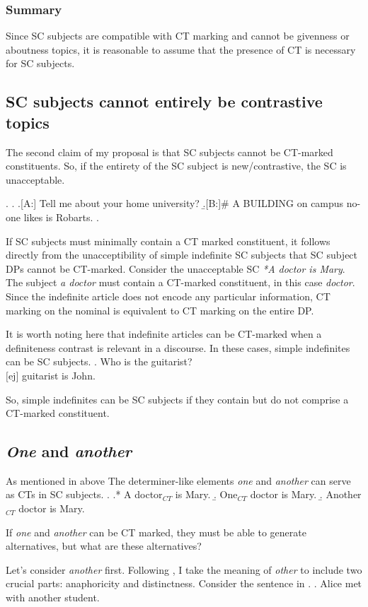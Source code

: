 \documentclass[GPFinal]{subfiles}
\begin{document}
\subsubsection{Summary}
Since SC subjects are compatible with CT marking and cannot be givenness or aboutness topics, it is reasonable to assume that the presence of CT is necessary for SC subjects.
\subsection{SC subjects cannot entirely be contrastive topics}
The second claim of my proposal is that SC subjects cannot be CT-marked constituents.
So, if the entirety of the SC subject is new/contrastive, the SC is unacceptable.

\ex.
\a.
\a.[A:] Tell me about your home university?
\b.[B:]\# A BUILDING on campus no-one likes is Robarts.
\z.

If SC subjects must minimally contain a CT marked constituent, it follows directly from the unacceptibility of simple indefinite SC subjects that SC subject DPs cannot be CT-marked.
Consider the unacceptable SC \textit{*A doctor is Mary}.
The subject \textit{a doctor} must contain a CT-marked constituent, in this case \textit{doctor}.
Since the indefinite article does not encode any particular information, CT marking on the nominal is equivalent to CT marking on the entire DP.

It is worth noting here that indefinite articles can be CT-marked when a definiteness contrast is relevant in a discourse.
In these cases, simple indefinites can be SC subjects.
\ex. Who is the guitarist?\\
$[$ej$]$ guitarist is John.

So, simple indefinites can be SC subjects if they contain but do not comprise a CT-marked constituent.
\subsection{\textit{One} and \textit{another}}
As mentioned in above The determiner-like elements \textit{one} and \textit{another} can serve as CTs in SC subjects.
\ex.\label{ex:AONeAnother}
\a.* A doctor$_{CT}$ is Mary.
\b.\label{ex:OneCT} One$_{CT}$ doctor is Mary.
\b.\label{ex:AnotherCT} Another$_{CT}$ doctor is Mary.

If \textit{one} and \textit{another} can be CT marked, they must be able to generate alternatives, but what are these alternatives?

Let's consider \textit{another} first.
Following \textcite{heim1991reciprocity}, I take the meaning of  \textit{other} to include two crucial parts: anaphoricity and distinctness.
Consider the sentence in \Next.
\ex. Alice met with another student.
\end{document}
